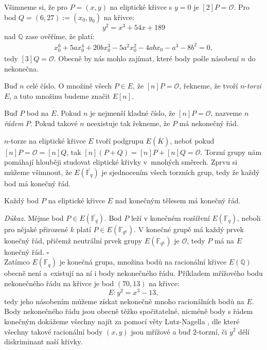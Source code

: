 \documentclass [12pt]{report}
\begin{document}
Všimneme si, že pro $P = (x,y)$ na eliptické křivce s $y=0$ je $[2] P = \mathcal{O}$. Pro bod $Q = (6,27) := (x_0,y_0)$ na křivce:
\begin{equation*}
y^2 = x^3 +54x+189
\end{equation*}
nad $\mathbb{Q}$ zase ověříme, že platí:
\begin{align*}
x_0^6 + 5 a x_0^4 + 20 b x_0^3 - 5 a^2 x_0^2 - 4ab x_0 - a^3 - 8 b^2 = 0,
\end{align*}
tedy $[3]Q = \mathcal{O}$. Obecně by nás mohlo zajímat, které body pošle násobení $n$ do nekonečna.


\begin{definice}
Buď $n$ celé číslo. O množině všech $P \in E$, že $[n] P = \mathcal{O}$, řekneme, že tvoří $n$-\textit{torzi} $E$, a tuto množinu budeme značit $E[n]$.
\end{definice}

\begin{definice}
Buď $P$ bod na $E$. Pokud $n$ je nejmenší kladné číslo, že $[n]P = \mathcal{O}$, nazveme $n$ \textit{řádem} $P$. Pokud takové $n$ neexistuje tak řekneme, že $P$ má nekonečný řád.
\end{definice}

$n$-torze na eliptické křivce $E$ tvoří podgrupu $E(\overline{K})$, neboť pokud $[n]P = \mathcal{O} = [n]Q$, tak $[n](P+Q) =[n]P+[n]Q=\mathcal{O}$. Torzní grupy nám pomáhají hlouběji studovat eliptické křivky v~mnohých směrech. Zprvu si můžeme všimnout, že $E(\overline{\mathbb{F}_q})$ je sjednocením všech torzních grup, tedy že každý bod má konečný řád.
\begin{veta}
Každý bod $P$ na eliptické křivce $E$ nad konečným tělesem má konečný řád.
\end{veta}
\noindent \textit{Důkaz. } Mějme bod $P \in E(\overline{\mathbb{F}_q})$. Bod $P$ leží v konečném rozšíření $E\left(\mathbb{F}_q\right)$, neboli pro nějaké přirozené $k$ platí $P \in E\left(\mathbb{F}_{q^k}\right)$. V konečné grupě má každý prvek konečný řád, přičemž neutrální prvek grupy $E\left(\mathbb{F}_{q^k}\right)$ je $\mathcal{O}$, tedy $P$ má na $E$ konečný řád. \hfill $\square$\\

Zatímco $E(\mathbb{F}_q)$ je konečná grupa, množina bodů na racionální křivce $E(\mathbb{Q})$ obecně není a~existují na ní i body nekonečného řádu. Příkladem mřížového bodu nekonečného řádu na křivce je bod $(70,13)$ na křivce:
\begin{equation*}
E : y^2 = x^3 - 13,
\end{equation*}
tedy jeho násobením můžeme získat nekonečně mnoho racionálních bodů na $E$. Body nekonečného řádu jsou obecně těžko spočitatelné, nicméně body s řádem konečným dokážeme všechny najít za pomocí věty Lutz-Nagella \cite[Thm. 8.7]{Washington}, dle které všechny takové racionální body $(x,y)$ jsou mřížové a buď $2$-torzní, či $y^2$ dělí diskriminant naší křivky.
\end{document}
